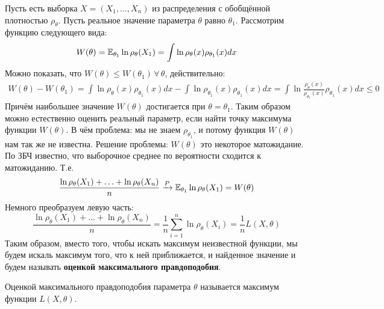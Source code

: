Пусть есть выборка $X = (X_1, \ldots, X_n)$ из распределения с обобщённой плотностью $\rho_{\theta}$. Пусть реальное значение параметра $\theta$
равно $\theta_1$. Рассмотрим функцию следующего вида:
\[
    W(\theta) = \mathbb{E}_{\theta_1}\ln\rho_{\theta}(X_1) = \int \ln\rho_{\theta}(x)\rho_{\theta_1}(x)dx
\]
Можно показать, что $W(\theta) \leq W(\theta_1)\,\forall\,\theta$, действительно:
\begin{align*}
    W(\theta) - W(\theta_1) = \int \ln\rho_{\theta}(x)\rho_{\theta_1}(x)dx - \int \ln\rho_{\theta_1}(x)\rho_{\theta_1}(x)dx =
    \int \ln\frac{\rho_{\theta}(x)}{\rho_{\theta_1}(x)}\rho_{\theta_1}(x)dx \leq 0
\end{align*}
Причём наибольшее значение $W(\theta)$ достигается при $\theta = \theta_1$. Таким образом можно естественно оценить реальный параметр, если найти точку
максимума функции $W(\theta)$. В чём проблема: мы не знаем $\rho_{\theta_1}$, и потому функция $W(\theta)$ нам так же не известна. Решение проблемы:
$W(\theta)$ это некоторое матожидание. По ЗБЧ известно, что выборочное среднее по вероятности сходится к матожиданию. Т.е.
\[
    \frac{\ln\rho_{\theta}(X_1) + \ldots + \ln\rho_{\theta}(X_n)}{n} \xrightarrow{P} \mathbb{E}_{\theta_1}\ln\rho_{\theta}(X_1) = W(\theta)
\]
Немного преобразуем левую часть:
\[
    \frac{\ln\rho_{\theta}(X_1) + \ldots + \ln\rho_{\theta}(X_n)}{n} = \frac{1}{n}\sum_{i = 1}^{n} \ln\rho_{\theta}(X_i) = \frac{1}{n}L(X, \theta)
\]
Таким образом, вместо того, чтобы искать максимум неизвестной функции, мы будем искаль максимум того, что к ней приближается, и найденное значение и будем
называть \textbf{оценкой максимального правдоподобия}.
\begin{definition}
    Оценкой максимального правдоподобия параметра $\theta$ называется максимум функции $L(X, \theta)$.
\end{definition}

